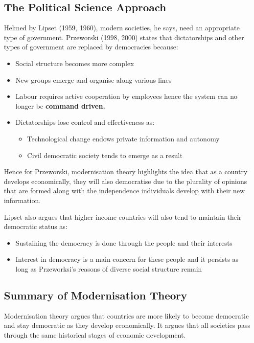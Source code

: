 \documentclass[12pt, letterpaper]{article}
\begin{document}
\subsection{The Political Science Approach}
Helmed by Lipset (1959, 1960), modern societies, he says, need an appropriate type of government. Przeworski (1998, 2000) states that dictatorships and other types of government are replaced by democracies because:
\begin{itemize}
	\item Social structure becomes more complex
	\item New groups emerge and organise along various lines
	\item Labour requires active cooperation by employees hence the system can no longer be \textbf{command driven.}
	\item Dictatorships lose control and effectiveness as:
		\begin{itemize}
			\item Technological change endows private information and autonomy
			\item Civil democratic society tends to emerge as a result
		\end{itemize}
\end{itemize}
Hence for Przeworski, modernisation theory highlights the idea that as a country develops economically, they will also democratise due to the plurality of opinions that are formed along with the independence individuals develop with their new information.

Lipset also argues that higher income countries will also tend to maintain their democratic status as:
\begin{itemize}
	\item Sustaining the democracy is done through the people and their interests
	\item Interest in democracy is a main concern for these people and it persists as long as Przeworksi's reasons of diverse social structure remain
\end{itemize}

\subsection{Summary of Modernisation Theory}
Modernisation theory argues that countries are more likely to become democratic and stay democratic as they develop economically. It argues that all societies pass through the same historical stages of economic development.
\end{document}
